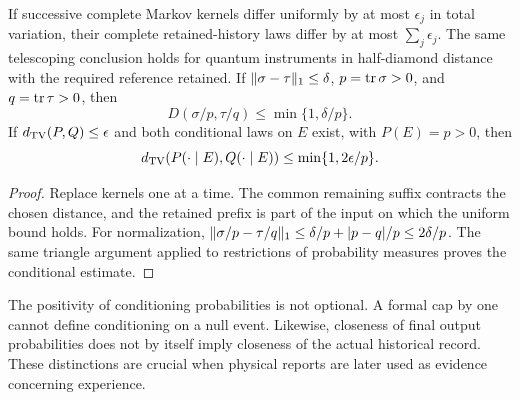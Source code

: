 \begin{lemma}\label{lem:errors}
If successive complete Markov kernels differ uniformly by at most $\epsilon_j$ in total variation, their complete retained-history laws differ by at most $\sum_j\epsilon_j$. The same telescoping conclusion holds for quantum instruments in half-diamond distance with the required reference retained. If $\lVert \sigma-\tau\rVert_1\le\delta$, $p=\operatorname{tr}\sigma>0$, and $q=\operatorname{tr}\tau>0$, then
\[
D(\sigma/p,\tau/q)\le\min\{1,\delta/p\}.
\]
If $d_{\mathrm{TV}}(P,Q)\le\epsilon$ and both conditional laws on $E$ exist, with $P(E)=p>0$, then
\[
d_{\mathrm{TV}}(P(\cdot\mid E),Q(\cdot\mid E))\le\min\{1,2\epsilon/p\}.
\]
\end{lemma}
\begin{proof}
Replace kernels one at a time. The common remaining suffix contracts the chosen distance, and the retained prefix is part of the input on which the uniform bound holds. For normalization,
$\lVert \sigma/p-\tau/q\rVert_1\le\delta/p+|p-q|/p\le2\delta/p$.
The same triangle argument applied to restrictions of probability measures proves the conditional estimate.
\end{proof}

The positivity of conditioning probabilities is not optional. A formal cap by one cannot define conditioning on a null event. Likewise, closeness of final output probabilities does not by itself imply closeness of the actual historical record. These distinctions are crucial when physical reports are later used as evidence concerning experience.

